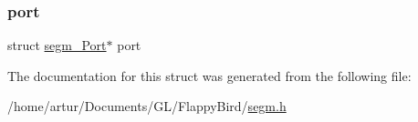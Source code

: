 \mbox{\label{structsegm___pin_a32bf9b7b4087810656144bd9bd1114bb}} 
\subsubsection{\texorpdfstring{port}{port}}
{\footnotesize\ttfamily struct \mbox{\hyperlink{structsegm___port}{segm\+\_\+\+Port}}$\ast$ port}



The documentation for this struct was generated from the following file\+:\begin{DoxyCompactItemize}
\item 
/home/artur/\+Documents/\+G\+L/\+Flappy\+Bird/\mbox{\hyperlink{segm_8h}{segm.\+h}}\end{DoxyCompactItemize}
